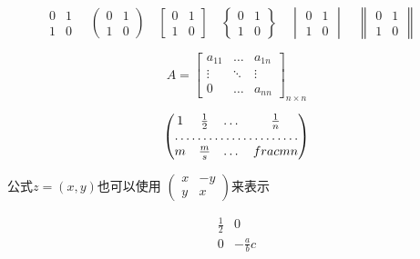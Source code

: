 \documentclass{article}
\begin{document}
    \[
        \begin{matrix}
            0 & 1 \\
            1 & 0
        \end{matrix} \quad
        \begin{pmatrix}
            0 & 1 \\
            1 & 0
        \end{pmatrix} \quad
        \begin{bmatrix}
            0 & 1 \\
            1 & 0
        \end{bmatrix} \quad
        \begin{Bmatrix}
            0 & 1 \\
            1 & 0
        \end{Bmatrix} \quad
        \begin{vmatrix}
            0 & 1 \\
            1 & 0
        \end{vmatrix} \quad
        \begin{Vmatrix}
            0 & 1 \\
            1 & 0
        \end{Vmatrix} \quad
    \]
    
    \[
        A = \begin{bmatrix}
            a_{11} & \dots & a_{1n} \\
            \vdots & \ddots & \vdots \\
            0 & \dots & a_{nn}
        \end{bmatrix}_{n \times n}
    \]

    \[
        \begin{pmatrix}
            1 & \frac 12 & \dots & \frac 1n \\
            \hdotsfor{4} \\
            m & \frac ms & \dots & frac mn
        \end{pmatrix}
    \]

    公式$ z = (x,y)$也可以使用
    \begin{math}
        \left(
            \begin{smallmatrix}
                x & -y \\ y & x
            \end{smallmatrix}
        \right)
    \end{math}来表示

    \[
        \begin{array}{r|r}
            \frac 12 & 0\\
            \hline
            0 & -\frac abc \\
        \end{array}
    \]
\end{document}
